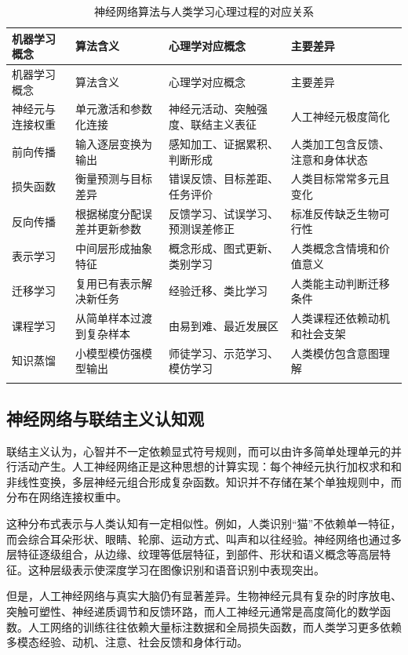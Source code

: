 \documentclass[UTF8,zihao=5,a4paper]{ctexart}
\begin{document}
\begin{longtable}{p{3.0cm}p{4.2cm}p{4.2cm}p{2.8cm}}
\toprule
机器学习概念 & 算法含义 & 心理学对应概念 & 主要差异 \\
\midrule
\endfirsthead
\toprule
机器学习概念 & 算法含义 & 心理学对应概念 & 主要差异 \\
\midrule
\endhead
神经元与连接权重 & 单元激活和参数化连接 & 神经元活动、突触强度、联结主义表征 & 人工神经元极度简化 \\
前向传播 & 输入逐层变换为输出 & 感知加工、证据累积、判断形成 & 人类加工包含反馈、注意和身体状态 \\
损失函数 & 衡量预测与目标差异 & 错误反馈、目标差距、任务评价 & 人类目标常常多元且变化 \\
反向传播 & 根据梯度分配误差并更新参数 & 反馈学习、试误学习、预测误差修正 & 标准反传缺乏生物可行性 \\
表示学习 & 中间层形成抽象特征 & 概念形成、图式更新、类别学习 & 人类概念含情境和价值意义 \\
迁移学习 & 复用已有表示解决新任务 & 经验迁移、类比学习 & 人类能主动判断迁移条件 \\
课程学习 & 从简单样本过渡到复杂样本 & 由易到难、最近发展区 & 人类课程还依赖动机和社会支架 \\
知识蒸馏 & 小模型模仿强模型输出 & 师徒学习、示范学习、模仿学习 & 人类模仿包含意图理解 \\
\bottomrule
\caption{神经网络算法与人类学习心理过程的对应关系}
\label{tab:nn_psychology_mapping}\\
\end{longtable}

\subsection{神经网络与联结主义认知观}

联结主义认为，心智并不一定依赖显式符号规则，而可以由许多简单处理单元的并行活动产生。人工神经网络正是这种思想的计算实现：每个神经元执行加权求和和非线性变换，多层神经元组合形成复杂函数。知识并不存储在某个单独规则中，而分布在网络连接权重中。

这种分布式表示与人类认知有一定相似性。例如，人类识别“猫”不依赖单一特征，而会综合耳朵形状、眼睛、轮廓、运动方式、叫声和以往经验。神经网络也通过多层特征逐级组合，从边缘、纹理等低层特征，到部件、形状和语义概念等高层特征。这种层级表示使深度学习在图像识别和语音识别中表现突出。

但是，人工神经网络与真实大脑仍有显著差异。生物神经元具有复杂的时序放电、突触可塑性、神经递质调节和反馈环路，而人工神经元通常是高度简化的数学函数。人工网络的训练往往依赖大量标注数据和全局损失函数，而人类学习更多依赖多模态经验、动机、注意、社会反馈和身体行动。
\end{document}
